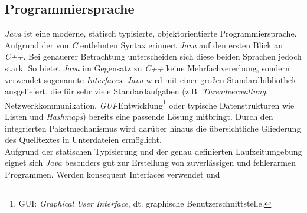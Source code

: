     \subsection{Programmiersprache}
        \emph{Java} ist eine moderne, statisch typisierte, objektorientierte Programmiersprache. Aufgrund der von 
        \emph{C} entlehnten Syntax erinnert \emph{Java} auf den ersten Blick an \emph{C++}. Bei genauerer 
        Betrachtung unterscheiden sich diese beiden Sprachen jedoch stark. So bietet \emph{Java} im Gegensatz zu 
        \emph{C++} keine Mehrfachvererbung, sondern verwendet sogenannte \emph{Interfaces}. \emph{Java} wird mit einer 
        großen Standardbibliothek ausgeliefert, die für sehr viele Standardaufgaben
        (z.B. \emph{Threadverwaltung}, Netzwerkkommunikation, \emph{GUI}-Entwicklung\footnote{GUI: 
         \emph{Graphical User Interface}, dt.  graphische Benutzerschnittstelle.} oder typische Datenstrukturen wie Listen und
         \emph{Hashmaps}) bereits eine
        passende Lösung mitbringt. Durch den integrierten Paketmechanismus wird darüber hinaus die übersichtliche
        Gliederung des Quelltextes in Unterdateien ermöglicht.\\
        Aufgrund der statischen Typisierung und der genau definierten Laufzeitumgebung eignet sich \emph{Java} besonders
        gut zur Erstellung von zuverlässigen und fehlerarmen Programmen. Werden konsequent Interfaces verwendet und
